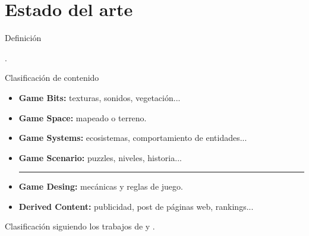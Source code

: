 \documentclass{beamer}
\begin{document}
\section{Estado del arte}

    \begin{frame}{Definición \scriptsize{\hfill \secname}}
    
     \cite{smith2015}.
        
    \end{frame}
    
    \begin{frame}{Clasificación de contenido \scriptsize{\hfill \secname}}
    
    \begin{itemize}
        \item \textbf{Game Bits:} texturas, sonidos, vegetación...
        \item \textbf{Game Space:} mapeado o terreno.
        \item \textbf{Game Systems:} ecosistemas, comportamiento de entidades...
        \item \textbf{Game Scenario:} puzzles, niveles, historia...
        \rule{9cm}{0.4pt}
        \item \textbf{Game Desing:} mecánicas y reglas de juego.
        \item \textbf{Derived Content:} publicidad, post de páginas web, rankings...
    \end{itemize}
    
    \bigskip
    
    \scriptsize{Clasificación siguiendo los trabajos de \cite{hendrikx2013} y \cite{barriga2019}.}
        
    \end{frame}
    
\end{document}
